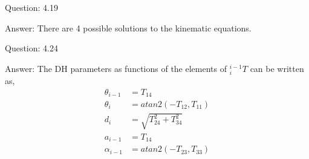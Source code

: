 \documentclass[a4paper]{article}
\begin{document}
\begin{qalist}
		\item[Question: 4.19] \setcounter{equation}{0} %
		\item[Answer:] There are 4 possible solutions to the kinematic equations.
		
		\item[Question: 4.24] \setcounter{equation}{0} %
		\item[Answer:] The DH parameters as functions of the elements of ${}^{i-1}_{i}T$ can be written as, 
			\begin{align}
				{\theta}_{i-1} &= {T}_{14}\\
				{\theta}_{i} &= atan2(-{T}_{12}, {T}_{11})\\
				{d}_{i} &= \sqrt{{T}^{2}_{24}+{T}^{2}_{34}}\\
				{a}_{i-1} &= {T}_{14}\\ 
				{\alpha}_{i-1} &= atan2(-{T}_{23}, {T}_{33})
			\end{align}
	\end{qalist}
\end{document}

